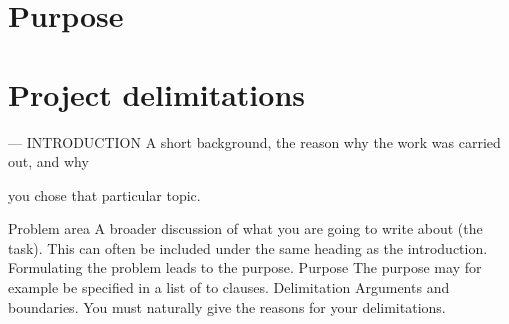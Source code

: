 \section{Purpose}
\section{Project delimitations}


---
INTRODUCTION A short background, the reason why the work was carried out, and why

you chose that particular topic.

 Problem area A broader discussion of what you are going to write about (the task). This
can often be included under the same heading as the introduction. Formulating the problem
leads to the purpose.
 Purpose  The purpose may for example be specified in a list of to clauses.
 Delimitation  Arguments and boundaries. You must naturally give the reasons for your
delimitations.
